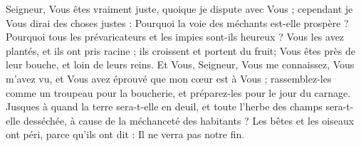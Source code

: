 Seigneur, Vous êtes vraiment juste, quoique je dispute avec Vous ; cependant je Vous dirai des choses justes : Pourquoi la voie des méchants est-elle prospère ? Pourquoi tous les prévaricateurs et les impies sont-ils heureux ?
Vous les avez plantés, et ils ont pris racine ; ils croissent et portent du fruit; Vous êtes près de leur bouche, et loin de leurs reins.
Et Vous, Seigneur, Vous me connaissez, Vous m'avez vu, et Vous avez éprouvé que mon cœur est à Vous ; rassemblez-les comme un troupeau pour la boucherie, et préparez-les pour le jour du carnage.
Jusques à quand la terre sera-t-elle en deuil, et toute l'herbe des champs sera-t-elle desséchée, à cause de la méchanceté des habitants ? Les bêtes et les oiseaux ont péri, parce qu'ils ont dit : Il ne verra pas notre fin.
